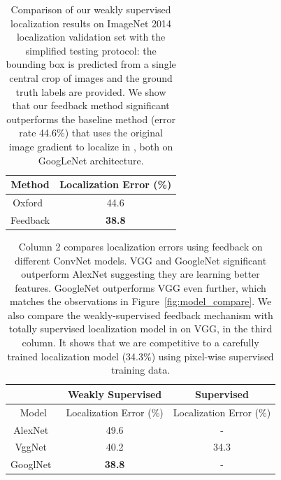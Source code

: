 \begin{table}[htb]
\centering
\small
\begin{tabular}{|c|c|}
\hline
Method & Localization Error (\%) \\ \hline
Oxford~\cite{simonyan2013deep} & 44.6 \\ \hline
Feedback & \textbf{38.8} \\ \hline
\end{tabular}
\caption{Comparison of our weakly supervised localization results on ImageNet 2014 localization validation set with the simplified testing protocol: the bounding box is predicted from a single central crop of images and the ground truth labels are provided.
We show that our feedback method significant outperforms the baseline method (error rate 44.6\%) that uses the original image gradient to localize in \cite{simonyan2013deep}, both on GoogLeNet architecture.
}
\label{tab:localization_accuracy}
\end{table}

\begin{table}[htb]
\centering
\small
\begin{tabular}{c|c|c}
\hline
                                      & Weakly Supervised             & Supervised              \\ \hline
Model                                 & Localization Error (\%)       & Localization Error (\%) \\ \hline
AlexNet~\cite{Krizhevsky2012ImageNet} & 49.6                          & -                       \\ \hline
VggNet~\cite{Simonyan2014Very}        & 40.2                          & 34.3\cite{Simonyan2014Very} \\ \hline
GooglNet~\cite{Szegedy2014Going}      & \textbf{38.8}                 & - \\ \hline
\end{tabular}
\caption{Column 2 compares localization errors using feedback on different ConvNet models. VGG and GoogleNet significant outperform AlexNet suggesting they are learning better features. GoogleNet outperforms VGG even further, which matches the observations in Figure~\ref{fig:model_compare}. We also compare the weakly-supervised feedback mechanism with totally supervised localization model in \cite{Simonyan2014Very} on VGG, in the third column. It shows that we are competitive to a carefully trained localization model (34.3\%) using pixel-wise supervised training data.}
\label{tab:localization_model_compare}
\end{table}

